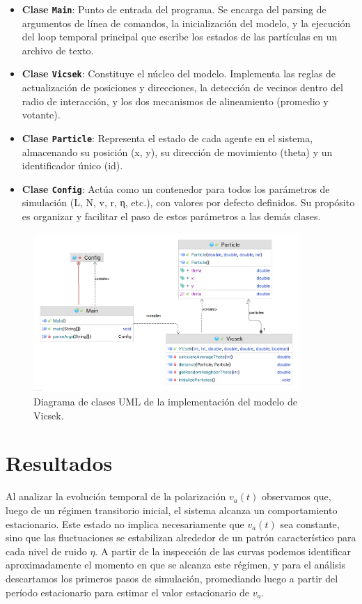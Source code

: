 \documentclass{article}
\begin{document}
\begin{itemize}
\item \textbf{Clase \texttt{Main}}: Punto de entrada del programa. Se encarga del parsing de argumentos de línea de comandos, la inicialización del modelo, y la ejecución del loop temporal principal que escribe los estados de las partículas en un archivo de texto.
\item \textbf{Clase \texttt{Vicsek}}: Constituye el núcleo del modelo. Implementa las reglas de actualización de posiciones y direcciones, la detección de vecinos dentro del radio de interacción, y los dos mecanismos de alineamiento (promedio y votante).
\item \textbf{Clase \texttt{Particle}}: Representa el estado de cada agente en el sistema, almacenando su posición (x, y), su dirección de movimiento (theta) y un identificador único (id).
\item \textbf{Clase \texttt{Config}}: Actúa como un contenedor para todos los parámetros de simulación (L, N, v, r, η, etc.), con valores por defecto definidos. Su propósito es organizar y facilitar el paso de estos parámetros a las demás clases.
\end{itemize}

\begin{figure}[H]
\centering
\includegraphics[width=0.9\textwidth]{TP2_UML.png}
\caption{Diagrama de clases UML de la implementación del modelo de Vicsek.}
\label{fig:uml}
\end{figure}

\section{Resultados}

Al analizar la evolución temporal de la polarización $v_a(t)$ observamos que, luego de un régimen transitorio inicial, el sistema alcanza un comportamiento estacionario. Este estado no implica necesariamente que $v_a(t)$ sea constante, sino que las fluctuaciones se estabilizan alrededor de un patrón característico para cada nivel de ruido $\eta$.  
A partir de la inspección de las curvas podemos identificar aproximadamente el momento en que se alcanza este régimen, y para el análisis descartamos los primeros pasos de simulación, promediando luego a partir del período estacionario para estimar el valor estacionario de $v_a$.
\end{document}
